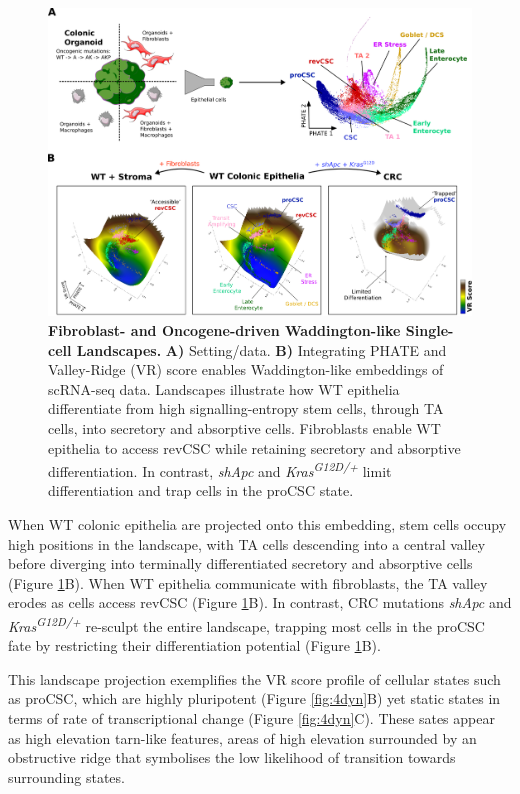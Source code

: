 \begin{figure}[h]
    \centering
    \includegraphics{05vr/figs/5VR_landscape.png}
    \caption{\textbf{Fibroblast- and Oncogene-driven Waddington-like Single-cell Landscapes.} \textbf{A)} Setting/data. \textbf{B)} Integrating PHATE and Valley-Ridge (VR) score enables Waddington-like embeddings of scRNA-seq data. Landscapes illustrate how WT epithelia differentiate from high signalling-entropy stem cells, through TA cells, into secretory and absorptive cells. Fibroblasts enable WT epithelia to access revCSC while retaining secretory and absorptive differentiation. In contrast, \textit{shApc} and \textit{Kras\textsuperscript{G12D/+}} limit differentiation and trap cells in the proCSC state.}
    \label{fig:5land}
\end{figure}

When WT colonic epithelia are projected onto this embedding, stem cells occupy high positions in the landscape, with TA cells descending into a central valley before diverging into terminally differentiated secretory and absorptive cells (Figure \ref{fig:5land}B). When WT epithelia communicate with fibroblasts, the TA valley erodes as cells access revCSC (Figure \ref{fig:5land}B). In contrast, CRC mutations \textit{shApc} and \textit{Kras\textsuperscript{G12D/+}} re-sculpt the entire landscape, trapping most cells in the proCSC fate by restricting their differentiation potential (Figure \ref{fig:5land}B). 

This landscape projection exemplifies the VR score profile of cellular states such as proCSC, which are highly pluripotent (Figure \ref{fig:4dyn}B) yet static states in terms of rate of transcriptional change (Figure \ref{fig:4dyn}C). These sates appear as high elevation tarn-like features, areas of high elevation surrounded by an obstructive ridge that symbolises the low likelihood of transition towards surrounding states.


